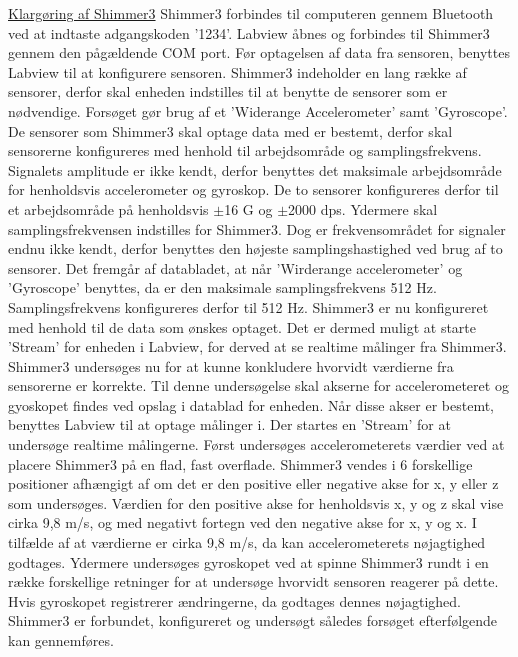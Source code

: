 \underline{Klargøring af Shimmer3}
Shimmer3 forbindes til computeren gennem Bluetooth ved at indtaste adgangskoden ’1234’.  \newline
Labview åbnes og forbindes til Shimmer3 gennem den pågældende COM port. Før optagelsen af data fra sensoren, benyttes Labview til at konfigurere sensoren. Shimmer3 indeholder en lang række af sensorer, derfor skal enheden indstilles til at benytte de sensorer som er nødvendige. Forsøget gør brug af et ’Widerange Accelerometer’ samt ’Gyroscope’. De sensorer som Shimmer3 skal optage data med er bestemt, derfor skal sensorerne konfigureres med henhold til arbejdsområde og samplingsfrekvens. Signalets amplitude er ikke kendt, derfor benyttes det maksimale arbejdsområde for henholdsvis accelerometer og gyroskop. De to sensorer konfigureres derfor til et arbejdsområde på henholdsvis $\pm$16 G og $\pm$2000 dps. Ydermere skal samplingsfrekvensen indstilles for Shimmer3. Dog er frekvensområdet for signaler endnu ikke kendt, derfor benyttes den højeste samplingshastighed ved brug af to sensorer. Det fremgår af databladet, at når ’Wirderange accelerometer’ og ’Gyroscope’ benyttes, da er den maksimale samplingsfrekvens 512 Hz. Samplingsfrekvens konfigureres derfor til 512 Hz. \newline
Shimmer3 er nu konfigureret med henhold til de data som ønskes optaget. Det er dermed muligt at starte ’Stream’ for enheden i Labview, for derved at se realtime målinger fra Shimmer3. \newline
Shimmer3 undersøges nu for at kunne konkludere hvorvidt værdierne fra sensorerne er korrekte. Til denne undersøgelse skal akserne for accelerometeret og gyoskopet findes ved opslag i datablad for enheden. Når disse akser er bestemt, benyttes Labview til at optage målinger i. Der startes en ’Stream’ for at undersøge realtime målingerne.
Først undersøges accelerometerets værdier ved at placere Shimmer3 på en flad, fast overflade. Shimmer3 vendes i 6 forskellige positioner afhængigt af om det er den positive eller negative akse for x, y eller z som undersøges. Værdien for den positive akse for henholdsvis x, y og z skal vise cirka 9,8 m/s, og med negativt fortegn ved den negative akse for x, y og x. I tilfælde af at værdierne er cirka 9,8 m/s, da kan accelerometerets nøjagtighed godtages. Ydermere undersøges gyroskopet ved at spinne Shimmer3 rundt i en række forskellige retninger for at undersøge hvorvidt sensoren reagerer på dette. Hvis gyroskopet registrerer ændringerne, da godtages dennes nøjagtighed. 
 \newline
Shimmer3 er forbundet, konfigureret og undersøgt således forsøget efterfølgende kan gennemføres.

